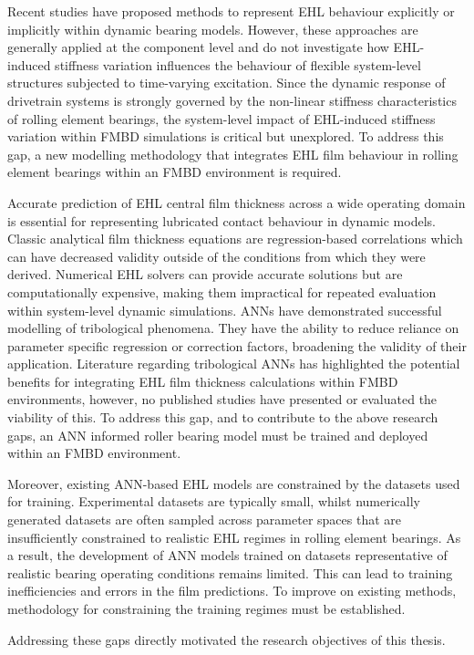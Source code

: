 Recent studies have proposed methods to represent EHL behaviour explicitly or implicitly within dynamic bearing models. However, these approaches are generally applied at the component level and do not investigate how EHL-induced stiffness variation influences the behaviour of flexible system-level structures subjected to time-varying excitation. Since the dynamic response of drivetrain systems is strongly governed by the non-linear stiffness characteristics of rolling element bearings, the system-level impact of EHL-induced stiffness variation within FMBD simulations is critical but unexplored. To address this gap, a new modelling methodology that integrates EHL film behaviour in rolling element bearings within an FMBD environment is required.

Accurate prediction of EHL central film thickness across a wide operating domain is essential for representing lubricated contact behaviour in dynamic models. Classic analytical film thickness equations are regression-based correlations which can have decreased validity outside of the conditions from which they were derived. Numerical EHL solvers can provide accurate solutions but are computationally expensive, making them impractical for repeated evaluation within system-level dynamic simulations. ANNs have demonstrated successful modelling of tribological phenomena. They have the ability to reduce reliance on parameter specific regression or correction factors, broadening the validity of their application. Literature regarding tribological ANNs has highlighted the potential benefits for integrating EHL film thickness calculations within FMBD environments, however, no published studies have presented or evaluated the viability of this. To address this gap, and to contribute to the above research gaps, an ANN informed roller bearing model must be trained and deployed within an FMBD environment.

Moreover, existing ANN-based EHL models are constrained by the datasets used for training. Experimental datasets are typically small, whilst numerically generated datasets are often sampled across parameter spaces that are insufficiently constrained to realistic EHL regimes in rolling element bearings. As a result, the development of ANN models trained on datasets representative of realistic bearing operating conditions remains limited. This can lead to training inefficiencies and errors in the film predictions. To improve on existing methods, methodology for constraining the training regimes must be established.

Addressing these gaps directly motivated the research objectives of this thesis.